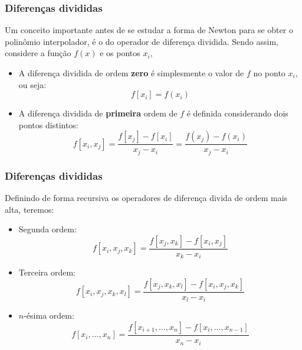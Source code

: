 \documentclass{beamer}
\theoremstyle{mystyle}
\begin{document}
\begin{frame}
	\frametitle{Diferenças divididas}
	Um conceito importante antes de se estudar a forma de Newton para se obter o polinômio interpolador, é o do operador de diferença dividida. Sendo assim, considere a função $ f(x) $ e os pontos $ x_{i} $,
	\begin{itemize}
		\item A diferença dividida de ordem \textbf{zero} é	simplesmente o valor de $ f $ no ponto $ x_{i} $, ou seja:
		\begin{equation*}
			f [x_{i}] = f (x_{i})
		\end{equation*}
		\item A diferença dividida de \textbf{primeira} ordem de $ f $ é definida considerando dois pontos distintos:
		\begin{equation*}
			f [x_{i},x_{j}] = \dfrac{f [x_{j}] -  f [x_{i}]}{ x_{j} - x_{i}} = \dfrac{f (x_{j}) -  f (x_{i})}{ x_{j} - x_{i}}
		\end{equation*}
	\end{itemize}
\end{frame}

\begin{frame}
	\frametitle{Diferenças divididas}
	Definindo de forma recursiva os operadores de diferença divida de ordem mais alta, teremos:
	\begin{itemize}
		\item Segunda ordem:
		\begin{equation*}
			f [x_{i},x_{j},x_{k}] = \dfrac{f [x_{j},x_{k}] -  f [x_{i},x_{j}]}{x_{k} - x_{i}}
		\end{equation*}
		\item Terceira ordem:
		\begin{equation*}
			f [x_{i},x_{j},x_{k},x_{l}] = \dfrac{f [x_{j},x_{k},x_{l}] -  f [x_{i},x_{j},x_{k}]}{x_{l} - x_{i}}
		\end{equation*}
		\item $ n $-ésima ordem:
		\begin{equation*}
			f [x_{i},\ldots,x_{n}] = \dfrac{f [x_{i+1},\ldots,x_{n}] -  f [x_{i},\ldots,x_{n-1}]}{x_{n} - x_{i}}
		\end{equation*}
	\end{itemize}
\end{frame}
\end{document}
